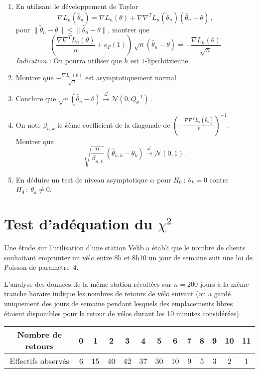 \documentclass[a4paper,11pt,fleqn]{article}
\newcommand{\1}{\ensuremath{\mathbbm{1}}}
\begin{document}
\begin{enumerate}[resume]
\item En utilisant le d\'eveloppement de Taylor
$$
\nabla L_n(\hat \theta_n)=\nabla L_n(\theta)+ \nabla\nabla^T L_n(\tilde\theta_{n}) (\hat\theta_n-\theta)\,,
$$
pour $\|\tilde\theta_{n}-\theta\|\leq \|\hat\theta_n-\theta\|$, montrer que
$$
 \left(\frac {\nabla\nabla^TL_n(\theta)}{n}+ o_P(1)\right)\, \sqrt n(\hat\theta_n-\theta) = -\frac {\nabla L_n(\theta)}{\sqrt n}
$$
\emph{Indication :} On pourra utiliser que $h$ est $1$-lipschitzienne. 

\item Montrer que $-\frac {\nabla L_n(\theta)}{\sqrt n}$ est asymptotiquement normal.

\item Conclure que $\sqrt n(\hat\theta_n-\theta)\xrightarrow[]{\mathcal L}{\mathcal N}(0,Q_\theta^{-1})$\,.

\item On note $\beta_{n,k}$ le $k${\`e}me coefficient de la diagonale
de $(-\frac {\nabla\nabla^TL_n(\hat\theta_n)}{n})^{-1}$. Montrer que
$$
\sqrt{\frac{n}{\beta_{n,k}}}\,(\hat\theta_{n,k}-\theta_k)\xrightarrow[]{\mathcal L}{\mathcal N}(0,1)\,.
$$
\item En d{\'e}duire un test de niveau asymptotique $\alpha$ pour 
$H_0~:~\theta_k=0$ contre $H_0~:~\theta_k\neq0$.
\end{enumerate}

\section{Test d'ad\'equation du $\chi^2$}
Une \'etude sur l'utilisation d'une station Velib a \'etabli
que le nombre de clients souhaitant emprunter un v\'elo entre 8h et 8h10 un jour
de semaine suit une loi de Poisson de param\`etre~4.  

L'analyse des donn\'ees de la m\^eme station r\'ecolt\'ees sur $n=200$ jours \`a la m\^eme tranche
horaire indique les nombres de retours de v\'elo suivant (on a gard\'e uniquement des jours de semaine pendant lesquels des emplacements
libres \'etaient disponibles pour le retour de v\'elos durant les 10 minutes consid\'er\'ees).
\begin{center}\begin{small}
\begin{tabular}{|c|c|c|c|c|c|c|c|c|c|c|c|c|}
\hline
Nombre de retours&0&1&2&3&4&5&6&7&8&9&10&11\\
\hline
Effectifs observ\'es&6&15&40&42&37&30&10&9&5&3&2&1\\
\hline
\end{tabular}\end{small}
\end{center}
\end{document}
